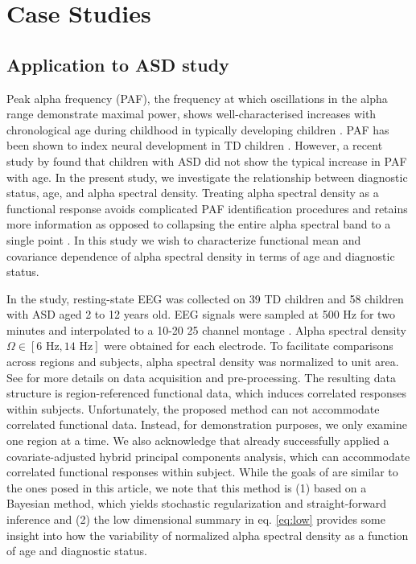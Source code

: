 \documentclass[useAMS,referee,usenatbib]{biom}
\begin{document}
\section{Case Studies}
\label{s:data}
\subsection{Application to ASD study}
Peak alpha frequency (PAF), the frequency at which oscillations in the alpha range demonstrate maximal power, shows well-characterised increases with chronological age during childhood in typically developing children \citep{Somsen1997, Dustman1999, Stroganova1999, Chiang2011, Cragg2011, Miskovic2015}. PAF has been shown to index neural development in TD children \citep{Valdes2010, Segalowitz2010, Rodriguez2017}. However, a recent study by \citet{Dickinson2017} found that children with ASD did not show the typical increase in PAF with age. In the present study, we investigate the relationship between diagnostic status, age, and alpha spectral density. Treating alpha spectral density as a functional response avoids complicated PAF identification procedures \citet{Dickinson2017} and retains more information as opposed to collapsing the entire alpha spectral band to a single point \citep{Scheffler2019, Scheffler2020}. In this study we wish to characterize functional mean and covariance dependence of alpha spectral density in terms of age and diagnostic status. 

In the \citet{Dickinson2017} study, resting-state EEG was collected on 39 TD children and 58 children with ASD aged 2 to 12 years old.  EEG signals were sampled at 500 Hz for two minutes and interpolated to a 10-20 25 channel montage \citep{Jasper1958, Perrin1989}. Alpha spectral density  $\Omega \in [6 \text{ Hz}, 14 \text{ Hz}]$ were obtained for each electrode. To facilitate comparisons across regions and subjects, alpha spectral density was normalized to unit area. See \cite{Scheffler2019} for more details on data acquisition and pre-processing. The resulting data structure is region-referenced functional data, which induces correlated responses within subjects. Unfortunately, the proposed method can not accommodate correlated functional data. Instead, for demonstration purposes, we only examine one region at a time. We also acknowledge that \citet{Scheffler2020} already successfully applied a covariate-adjusted hybrid principal components analysis, which can accommodate correlated functional responses within subject. While the goals of \citet{Scheffler2020} are similar to the ones posed in this article, we note that this method is (1) based on a Bayesian method, which yields stochastic regularization and straight-forward inference and (2) the low dimensional summary in eq. \ref{eq:low} provides some insight into how the variability of normalized alpha spectral density as a function of age and diagnostic status. 
\end{document}
